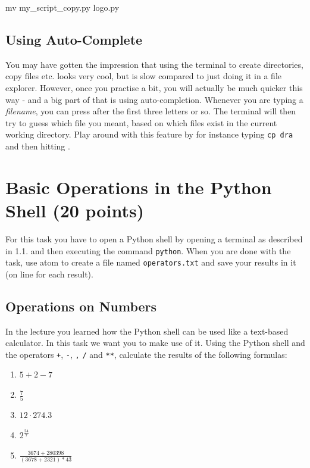 \vspace{1em}

\begin{solution}
    \begin{outputcode}
mv my_script_copy.py logo.py
    \end{outputcode}
\end{solution}

\subsection{Using Auto-Complete}

You may have gotten the impression that using the terminal to create directories, copy files etc. looks very cool, but is slow compared to just doing it in a file explorer. However, once you practise a bit, you will actually be much quicker this way - and a big part of that is using auto-completion. Whenever you are typing a \textit{filename}, you can press \keys{\tab} after the first three letters or so. The terminal will then try to guess which file you meant, based on which files exist in the current working directory. Play around with this feature by for instance typing \texttt{cp dra} and then hitting \keys{\tab}.


\section{Basic Operations in the Python Shell (20 points)}

For this task you have to open a Python shell by opening a terminal as described in 1.1. and then executing the command \texttt{python}. When you are done with the task, use atom to create a file named \texttt{operators.txt} and save your results in it (on line for each result).

\subsection{Operations on Numbers}

In the lecture you learned how the Python shell can be used like a text-based calculator. In this task we want you to make use of it. Using the Python shell and the operators \texttt+, \texttt-, \texttt*, \texttt/ and \texttt{**}, calculate the results of the following formulas:

\begin{enumerate}

\item $5 + 2 - 7$
\item $\frac{7}{5}$
\item $12 \cdot 274.3$
\item $2^{\frac{24}{7}}$
\item $\frac{3674 + 280398}{(3678 + 2321) * 43}$

\end{enumerate}

